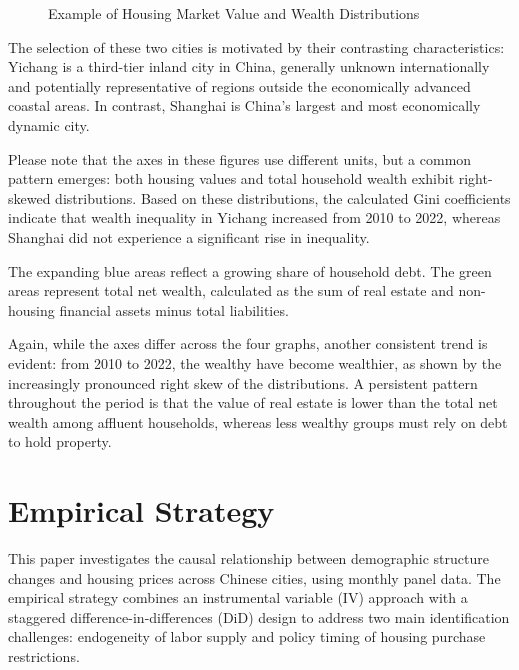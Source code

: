 \documentclass[12pt,english]{article}
\begin{document}
	\begin{figure}[H]
		\centering
		\caption{Example of Housing Market Value and Wealth Distributions}
	\end{figure}
	
	The selection of these two cities is motivated by their contrasting characteristics: Yichang is a third-tier inland city in China, generally unknown internationally and potentially representative of regions outside the economically advanced coastal areas. In contrast, Shanghai is China’s largest and most economically dynamic city.
	
	Please note that the axes in these figures use different units, but a common pattern emerges: both housing values and total household wealth exhibit right-skewed distributions. Based on these distributions, the calculated Gini coefficients indicate that wealth inequality in Yichang increased from 2010 to 2022, whereas Shanghai did not experience a significant rise in inequality.
	
	The expanding blue areas reflect a growing share of household debt. The green areas represent total net wealth, calculated as the sum of real estate and non-housing financial assets minus total liabilities.
	
	Again, while the axes differ across the four graphs, another consistent trend is evident: from 2010 to 2022, the wealthy have become wealthier, as shown by the increasingly pronounced right skew of the distributions. A persistent pattern throughout the period is that the value of real estate is lower than the total net wealth among affluent households, whereas less wealthy groups must rely on debt to hold property.
	
	
	
	\section{Empirical Strategy}
	
	This paper investigates the causal relationship between demographic structure changes and housing prices across Chinese cities, using monthly panel data. The empirical strategy combines an instrumental variable (IV) approach with a staggered difference-in-differences (DiD) design to address two main identification challenges: endogeneity of labor supply and policy timing of housing purchase restrictions.
	
\end{document}
